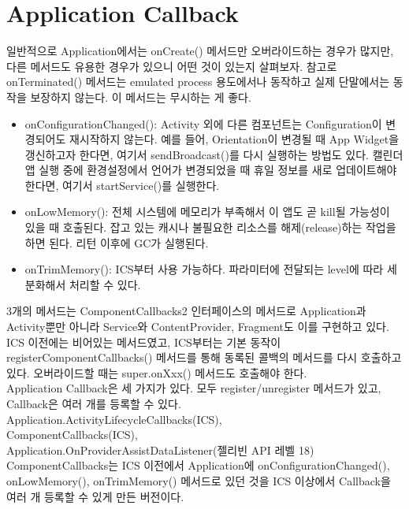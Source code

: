 \section{Application Callback}
일반적으로 Application에서는 onCreate() 메서드만 오버라이드하는 경우가 많지만,  
다른 메서드도 유용한 경우가 있으니 어떤 것이 있는지 살펴보자. 참고로 onTerminated() 메서드는 emulated process 용도에서나 동작하고 실제 단말에서는 동작을 보장하지 않는다. 이 메서드는 무시하는 게 좋다.
\begin{itemize}
\item onConfigurationChanged(): Activity 외에 다른 컴포넌트는 Configuration이 변경되어도 재시작하지 않는다. 
예를 들어, Orientation이 변경될 때 App Widget을 갱신하고자 한다면, 여기서 sendBroadcast()를 다시 실행하는 방법도 있다. 캘린더 앱 실행 중에 환경설정에서 언어가 변경되었을 때 휴일 정보를 새로 업데이트해야 한다면, 여기서 startService()를 실행한다.
\item onLowMemory(): 전체 시스템에 메모리가 부족해서 이 앱도 곧 kill될 가능성이 있을 때 호출된다. 잡고 있는 캐시나 불필요한 리소스를 해제(release)하는 작업을 하면 된다. 리턴 이후에 GC가 실행된다.
\item onTrimMemory(): ICS부터 사용 가능하다. 파라미터에 전달되는 level에 따라 세분화해서 처리할 수 있다.
\end{itemize}
3개의 메서드는 ComponentCallbacks2 인터페이스의 메서드로 Application과 Activity뿐만 아니라 Service와 ContentProvider, Fragment도 이를 구현하고 있다. ICS 이전에는 비어있는 메서드였고, ICS부터는 기본 동작이 registerComponentCallbacks() 메서드를 통해 동록된 콜백의 메서드를 다시 호출하고 있다. 오버라이드할 때는 super.onXxx() 메서드도 호출해야 한다.\\

Application Callback은 세 가지가 있다. 모두 register/unregister 메서드가 있고, Callback은 여러 개를 등록할 수 있다.\\

Application.ActivityLifecycleCallbacks(ICS), \\
ComponentCallbacks(ICS), \\
Application.OnProviderAssistDataListener(젤리빈 API 레벨 18)\\

ComponentCallbacks는 ICS 이전에서 Application에 onConfigurationChanged(), onLowMemory(), onTrimMemory() 메서드로 있던 것을 ICS 이상에서 Callback을 여러 개 등록할 수 있게 만든 버전이다.\\

